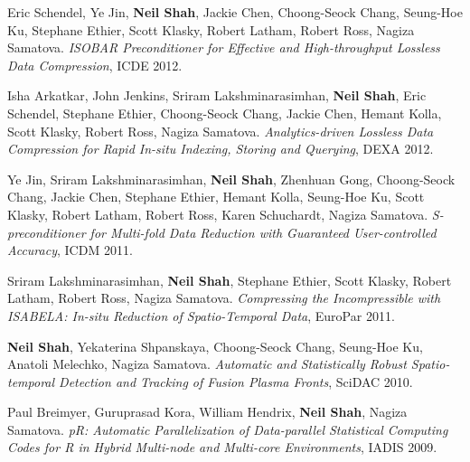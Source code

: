 \documentclass{article}
\begin{document}
\begin{etaremune}[itemsep=1pt,parsep=0pt]
\item Eric Schendel, Ye Jin, {\bf Neil Shah}, Jackie Chen, Choong-Seock Chang, Seung-Hoe Ku, Stephane Ethier, Scott Klasky, Robert Latham, Robert Ross, Nagiza Samatova. \emph{ISOBAR Preconditioner for Effective and High-throughput Lossless Data Compression}, ICDE 2012.

\item Isha Arkatkar, John Jenkins, Sriram Lakshminarasimhan, {\bf Neil Shah}, Eric Schendel, Stephane Ethier, Choong-Seock Chang, Jackie Chen, Hemant Kolla, Scott Klasky, Robert Ross, Nagiza Samatova. \emph{Analytics-driven Lossless Data Compression for Rapid In-situ Indexing, Storing and Querying}, DEXA 2012.

\item Ye Jin, Sriram Lakshminarasimhan, {\bf Neil Shah}, Zhenhuan Gong, Choong-Seock Chang, Jackie Chen, Stephane Ethier, Hemant Kolla, Seung-Hoe Ku, Scott Klasky, Robert Latham, Robert Ross, Karen Schuchardt, Nagiza Samatova. \emph{S-preconditioner for Multi-fold Data Reduction with Guaranteed User-controlled Accuracy}, ICDM 2011.

\item Sriram Lakshminarasimhan, {\bf Neil Shah}, Stephane Ethier, Scott Klasky, Robert Latham, Robert Ross, Nagiza Samatova. \emph{Compressing the Incompressible with ISABELA: In-situ Reduction of Spatio-Temporal Data}, EuroPar 2011.

\item {\bf Neil Shah}, Yekaterina Shpanskaya, Choong-Seock Chang, Seung-Hoe Ku, Anatoli Melechko, Nagiza Samatova. \emph{Automatic and Statistically Robust Spatio-temporal Detection and Tracking of Fusion Plasma Fronts}, SciDAC 2010.

\item  Paul Breimyer, Guruprasad Kora, William Hendrix, {\bf Neil Shah}, Nagiza Samatova. \emph{pR: Automatic Parallelization of Data-parallel Statistical Computing Codes for R in Hybrid Multi-node and Multi-core Environments}, IADIS 2009.

\end{etaremune}
\end{document}
